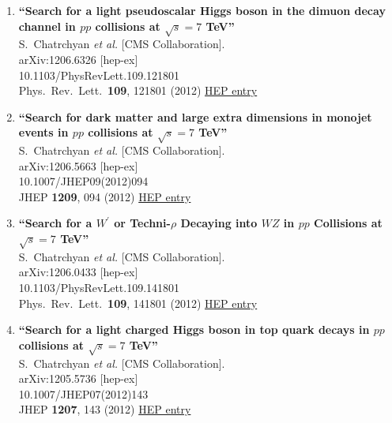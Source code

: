 \documentclass{article}
\begin{document}
\begin{enumerate}
\item%
{\bf ``Search for a light pseudoscalar Higgs boson in the dimuon decay channel in $pp$ collisions at $\sqrt{s}=7$ TeV''}
  \\{}S.~Chatrchyan {\it et al.} [CMS Collaboration].
  \\{}arXiv:1206.6326 [hep-ex]
    \\{}10.1103/PhysRevLett.109.121801
\\{}Phys.\ Rev.\ Lett.\  {\bf 109}, 121801 (2012) %
\href{http://inspirehep.net/record/1120142}{HEP entry}


\item%
{\bf ``Search for dark matter and large extra dimensions in monojet events in $pp$ collisions at $\sqrt{s}=7$ TeV''}
  \\{}S.~Chatrchyan {\it et al.} [CMS Collaboration].
  \\{}arXiv:1206.5663 [hep-ex]
    \\{}10.1007/JHEP09(2012)094
\\{}JHEP {\bf 1209}, 094 (2012) %
\href{http://inspirehep.net/record/1119567}{HEP entry}


\item%
{\bf ``Search for a $W^\prime$ or Techni-$\rho$ Decaying into $WZ$ in $pp$ Collisions at $\sqrt{s}=7$ TeV''}
  \\{}S.~Chatrchyan {\it et al.} [CMS Collaboration].
  \\{}arXiv:1206.0433 [hep-ex]
    \\{}10.1103/PhysRevLett.109.141801
\\{}Phys.\ Rev.\ Lett.\  {\bf 109}, 141801 (2012) %
\href{http://inspirehep.net/record/1117012}{HEP entry}


\item%
{\bf ``Search for a light charged Higgs boson in top quark decays in $pp$ collisions at $\sqrt{s}=7$ TeV''}
  \\{}S.~Chatrchyan {\it et al.} [CMS Collaboration].
  \\{}arXiv:1205.5736 [hep-ex]
    \\{}10.1007/JHEP07(2012)143
\\{}JHEP {\bf 1207}, 143 (2012) %
\href{http://inspirehep.net/record/1116149}{HEP entry}


\end{enumerate}
\end{document}
